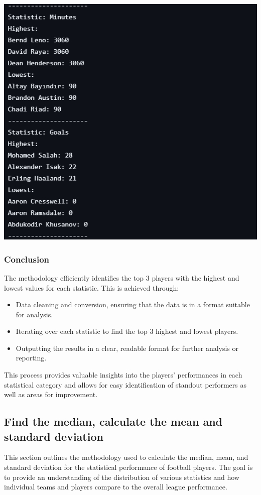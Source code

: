 \documentclass[a4paper,12pt]{article}
\begin{document}
\includegraphics{top3.png}

\subsubsection{Conclusion}

The methodology efficiently identifies the top 3 players with the highest and lowest values for each statistic. This is achieved through:
\begin{itemize}
    \item Data cleaning and conversion, ensuring that the data is in a format suitable for analysis.
    \item Iterating over each statistic to find the top 3 highest and lowest players.
    \item Outputting the results in a clear, readable format for further analysis or reporting.
\end{itemize}

This process provides valuable insights into the players' performances in each statistical category and allows for easy identification of standout performers as well as areas for improvement.






\subsection{Find the median, calculate the mean and standard deviation}
This section outlines the methodology used to calculate the median, mean, and standard deviation for the statistical performance of football players. The goal is to provide an understanding of the distribution of various statistics and how individual teams and players compare to the overall league performance.
\end{document}
